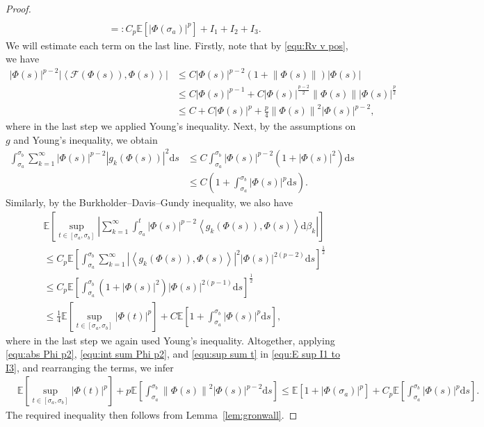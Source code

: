 \documentclass[11pt, reqno]{amsart}
\theoremstyle{definition}
\numberwithin{equation}{section}
\newcommand{\bb}{\mathbb}
\newcommand{\ds}{\mathrm{d}s}
\newcommand{\norm}[1]{\left\|{#1}\right\|}
\newcommand{\inpro}[2]{\left\langle#1,#2\right\rangle}
\newcommand{\abs}[1]{\left|{#1}\right|}
\begin{document}
\begin{proof}
\begin{align}
	\nonumber\\
	&=: C_p \bb{E}\left[\abs{\Phi(\sigma_a)}^p \right]  + I_1+I_2+I_3.
\end{align}
We will estimate each term on the last line. Firstly, note that by \eqref{equ:Rv v pos}, we have
\begin{align}\label{equ:abs Phi p2}
	\abs{\Phi(s)}^{p-2} \abs{\inpro{\mathcal{F}(\Phi(s))}{\Phi(s)}}
	&\leq
	C \abs{\Phi(s)}^{p-2} \left(1+\norm{\Phi(s)}\right) \abs{\Phi(s)}
	\nonumber\\
	&\leq
	C \abs{\Phi(s)}^{p-1} + C \abs{\Phi(s)}^{\frac{p-2}{2}}  \norm{\Phi(s)} \abs{\Phi(s)}^{\frac{p}{2}}
	\nonumber\\
	&\leq
	C + C\abs{\Phi(s)}^p + \frac{p}{4} \norm{\Phi(s)}^2 \abs{\Phi(s)}^{p-2},
\end{align}
where in the last step we applied Young's inequality. Next, by the assumptions on $g$ and Young's inequality, we obtain
\begin{align}\label{equ:int sum Phi p2}
	\int_{\sigma_a}^{\sigma_b} \sum_{k=1}^\infty   \abs{\Phi(s)}^{p-2} \abs{g_k(\Phi(s))}^2 \ds
	&\leq
	C \int_{\sigma_a}^{\sigma_b} \abs{\Phi(s)}^{p-2} \left(1+\abs{\Phi(s)}^2\right) \ds
	\nonumber\\
	&\leq
	C\left(1+\int_{\sigma_a}^{\sigma_b} \abs{\Phi(s)}^p \ds \right).
\end{align}
Similarly, by the Burkholder--Davis--Gundy inequality, we also have
\begin{align}\label{equ:sup sum t}
	&\bb{E}\left[ \sup_{t\in [\sigma_a,\sigma_b]} \abs{\sum_{k=1}^\infty \int_{\sigma_a}^t \abs{\Phi(s)}^{p-2} \inpro{g_k(\Phi(s))}{\Phi(s)} \mathrm{d}\beta_k} \right]
	\nonumber\\
	&\leq
	C_p \bb{E} \left[\int_{\sigma_a}^{\sigma_b} \sum_{k=1}^\infty \abs{\inpro{g_k(\Phi(s))}{\Phi(s)}}^2 \abs{\Phi(s)}^{2(p-2)} \ds \right]^{\frac12}
	\nonumber\\
	&\leq
	C_p \bb{E} \left[\int_{\sigma_a}^{\sigma_b} \left(1+\abs{\Phi(s)}^2 \right) \abs{\Phi(s)}^{2(p-1)} \ds \right]^{\frac12}
	\nonumber\\
	&\leq
	\frac14 \bb{E} \left[\sup_{t\in [\sigma_a,\sigma_b]} \abs{\Phi(t)}^p\right]
	+
	C \bb{E} \left[1+\int_{\sigma_a}^{\sigma_b} \abs{\Phi(s)}^p \ds \right],
\end{align}
where in the last step we again used Young's inequality. Altogether, applying \eqref{equ:abs Phi p2}, \eqref{equ:int sum Phi p2}, and \eqref{equ:sup sum t} in \eqref{equ:E sup I1 to I3}, and rearranging the terms, we infer
\begin{align*}
	&\bb{E} \left[\sup_{t\in [\sigma_a,\sigma_b]} \abs{\Phi(t)}^p\right] 
	+
	p \bb{E} \left[\int_{\sigma_a}^{\sigma_b} \norm{\Phi(s)}^2 \abs{\Phi(s)}^{p-2} \ds \right]
	\le
	\bb{E}\left[1+\abs{\Phi(\sigma_a)}^p \right] 
	+
	C_p \bb{E} \left[\int_{\sigma_a}^{\sigma_b} \abs{\Phi(s)}^p \ds \right].
\end{align*}
The required inequality then follows from Lemma~\ref{lem:gronwall}.
\end{proof}
\end{document}
